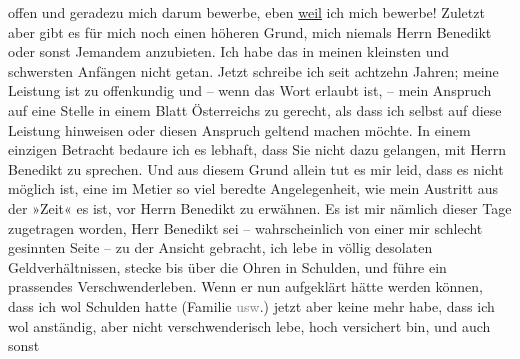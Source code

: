 \begin{ledgroupsized}[t]{13cm}
               offen und geradezu mich darum bewerbe, {\dotstwo} eben \uline{weil} ich mich bewerbe! Zuletzt aber gibt es für mich
               noch einen höheren Grund, mich \strikeout{\textcolor{gray}{×}\-\textcolor{gray}{×}\-\textcolor{gray}{×}\-\textcolor{gray}{×}\-\textcolor{gray}{×}\-\textcolor{gray}{×}\-\textcolor{gray}{×}\-\textcolor{gray}{×}\-\textcolor{gray}{×}\-\textcolor{gray}{×}\-\textcolor{gray}{×}\-\textcolor{gray}{×}\-\textcolor{gray}{×}\-\textcolor{gray}{×}\-\textcolor{gray}{×}\-\textcolor{gray}{×}\-\textcolor{gray}{×}\-\textcolor{gray}{×}\-\textcolor{gray}{×}\-\textcolor{gray}{×}} niemals Herrn Benedikt oder sonst
               Jemandem anzubieten. Ich habe das in meinen kleinsten und schwersten Anfängen nicht
               getan. Jetzt schreibe ich seit achtzehn Jahren; meine Leistung ist zu offenkundig und
               – wenn das Wort erlaubt ist, – mein Anspruch auf eine Stelle in einem Blatt Österreichs zu gerecht, als dass ich selbst auf
               diese Leistung hinweisen oder diesen Anspruch geltend machen möchte.\pend
           \pstart
           In einem einzigen Betracht bedaure ich es lebhaft, dass Sie nicht dazu gelangen, mit
               Herrn Benedikt zu sprechen. Und aus diesem
               Grund allein tut es mir leid, dass es nicht möglich ist, eine im Metier so viel
               beredte Angelegenheit, wie mein Austritt aus der »Zeit« es ist, vor Herrn Benedikt zu
               erwähnen. Es ist mir nämlich dieser Tage zugetragen worden, Herr Benedikt sei – wahrscheinlich von einer mir schlecht
               gesinnten Seite – zu der Ansicht gebracht, ich lebe in völlig desolaten
               Geldverhältnissen, stecke bis über die Ohren in Schulden, und führe ein prassendes
               Verschwenderleben. Wenn er nun aufgeklärt hätte werden können, dass ich wol Schulden
               hatte (Familie \textcolor{gray}{usw}.) jetzt aber keine mehr habe, dass ich wol
               anständig, aber nicht verschwenderisch lebe, hoch versichert bin, und auch sonst

\end{ledgroupsized}
